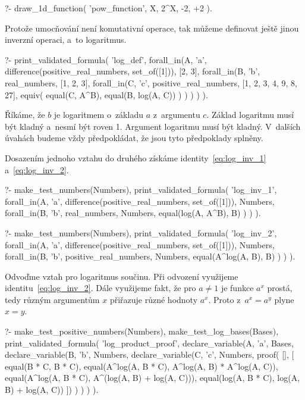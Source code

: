 \begin{prolog}
?-	draw_1d_function(
		'pow_function',
		X,
		2^X,
		-2, +2
	).				
\end{prolog}


Protože umocňování není komutativní operace, tak můžeme definovat ještě jinou inverzní operaci, a~to logaritmus.

\begin{prolog}
?-	print_validated_formula(
		'log_def',
		forall_in(A, 'a', difference(positive_real_numbers, set_of([1])), [2, 3],
			forall_in(B, 'b', real_numbers, [1, 2, 3],
				forall_in(C, 'c', positive_real_numbers, [1, 2, 3, 4, 9, 8, 27],
					equiv(
						equal(C, A^B),
						equal(B, log(A, C))
					)
				)
			)
		)
	).				
\end{prolog}

Říkáme, že \(b\) je logaritmem o~základu \(a\) z~argumentu \(c\). Základ logaritmu musí být kladný a~nesmí být roven 1. Argument logaritmu musí být kladný. V~dalších úvahách budeme vždy předpokládat, že jsou tyto předpoklady splněny.

Dosazením jednoho vztahu do druhého získáme identity~\eqref{eq:log_inv_1} a~\eqref{eq:log_inv_2}.

\begin{fact}
\begin{prolog}
?-	make_test_numbers(Numbers),
	print_validated_formula(
		'log_inv_1',
		forall_in(A, 'a', difference(positive_real_numbers, set_of([1])), Numbers,
			forall_in(B, 'b', real_numbers, Numbers,
				equal(log(A, A^B), B)
			)
		)
	).				
\end{prolog}
\begin{prolog}
?-	make_test_numbers(Numbers),
	print_validated_formula(
		'log_inv_2',
		forall_in(A, 'a', difference(positive_real_numbers, set_of([1])), Numbers,
			forall_in(B, 'b', positive_real_numbers, Numbers,
				equal(A^log(A, B), B)
			)
		)
	).				
\end{prolog}
\end{fact}

Odvoďme vztah pro logaritmus součinu. Při odvození využijeme identitu~\eqref{eq:log_inv_2}. Dále využijeme fakt, že pro \(a \neq 1\) je funkce \(a^x\) prostá, tedy různým argumentům \(x\) přiřazuje různé hodnoty \(a^x\). Proto z~\(a^x = a^y\) plyne \(x = y\).

\begin{prolog}
?-	make_test_positive_numbers(Numbers),
	make_test_log_bases(Bases),
	print_validated_formula(
		'log_product_proof',
		declare_variable(A, 'a', Bases,
			declare_variable(B, 'b', Numbers,
				declare_variable(C, 'c', Numbers,
					proof(
					[],
					[
						equal(B * C, B * C),
						equal(A^log(A, B * C), A^log(A, B) * A^log(A, C)),
						equal(A^log(A, B * C), A^(log(A, B) + log(A, C))),
						equal(log(A, B * C), log(A, B) + log(A, C))
					])
				)
			)
		)
	).				
\end{prolog}

